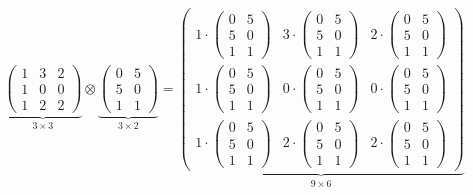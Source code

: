 \documentclass{article}
\begin{document}
\begin{align*}
  \underbrace{\begin{pmatrix} 1&3&2\\1&0&0\\1&2&2 \end{pmatrix}}_{3\times3} \otimes \underbrace{\begin{pmatrix}0&5\\5&0\\1&1 \end{pmatrix}}_{3\times2} =
  \underbrace{\begin{pmatrix} 1\cdot\begin{pmatrix}0&5\\5&0\\1&1 \end{pmatrix}&3\cdot\begin{pmatrix}0&5\\5&0\\1&1 \end{pmatrix}&2\cdot\begin{pmatrix}0&5\\5&0\\1&1 \end{pmatrix}\\1\cdot\begin{pmatrix}0&5\\5&0\\1&1 \end{pmatrix}&0\cdot\begin{pmatrix}0&5\\5&0\\1&1 \end{pmatrix}&0\cdot\begin{pmatrix}0&5\\5&0\\1&1 \end{pmatrix}\\1\cdot\begin{pmatrix}0&5\\5&0\\1&1 \end{pmatrix}&2\cdot\begin{pmatrix}0&5\\5&0\\1&1 \end{pmatrix}&2\cdot\begin{pmatrix}0&5\\5&0\\1&1 \end{pmatrix}  \end{pmatrix}}_{9\times6}
\end{align*}
\end{document}
